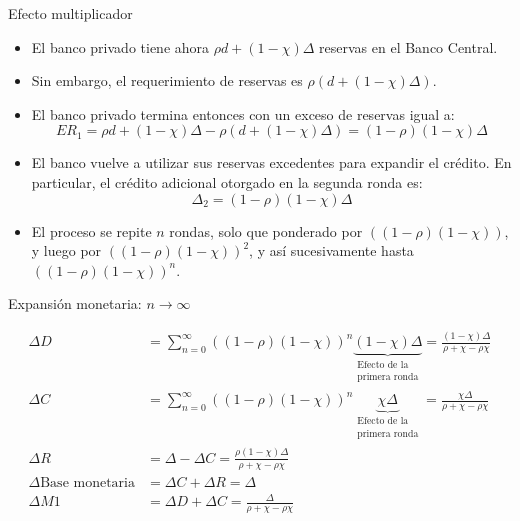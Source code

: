 \documentclass[aspectratio=169,11pt]{beamer}
\begin{document}
\begin{frame}{Efecto multiplicador}
\small
    \begin{itemize}
        \item El banco privado tiene ahora $\rho d + (1 - \chi)\Delta$ reservas en el Banco Central.
        \item Sin embargo, el requerimiento de reservas es $\rho(d + (1-\chi)\Delta)$.
        \item El banco privado termina entonces con un exceso de reservas igual a:
        $$
        ER_1 = \rho d + (1 - \chi)\Delta - \rho(d + (1-\chi)\Delta) = (1 - \rho)(1-\chi)\Delta
        $$
        \item El banco vuelve a utilizar sus reservas excedentes para expandir el crédito. En particular, el crédito adicional otorgado en la segunda ronda es:
        $$
        \Delta_2 = (1 - \rho)(1-\chi)\Delta
        $$
        \item El proceso se repite $n$ rondas, solo que ponderado por $((1 - \rho)(1-\chi))$, y luego por $((1 - \rho)(1-\chi))^2$, y así sucesivamente hasta $((1 - \rho)(1-\chi))^n$.
    \end{itemize}
\end{frame}






\begin{frame}{Expansión monetaria: $n \to \infty$}
    \footnotesize

    \begin{align*}
        \Delta D
        &= \sum_{n=0}^{\infty} ((1-\rho)(1-\chi))^n
        \underbrace{(1-\chi)\Delta}_{\substack{
        \text{Efecto de la}\\\text{primera ronda}}}
        = \frac{(1-\chi)\Delta}{\rho+\chi-\rho\chi}
        \\[0.1cm]
        \Delta C
        &= \sum_{n=0}^{\infty} ((1-\rho)(1-\chi))^n
        \underbrace{\chi\Delta}_{\substack{
        \text{Efecto de la}\\\text{primera ronda}}}
        = \frac{\chi\Delta}{\rho+\chi-\rho\chi}
        \\[0.1cm]
        \Delta R
        &= \Delta-\Delta C
        = \frac{\rho(1-\chi)\Delta}{\rho+\chi-\rho\chi}
        \\[0.1cm]
        \Delta \text{Base monetaria}
        &= \Delta C + \Delta R=\Delta
        \\[0.1cm]
        \Delta M1
        &= \Delta D+\Delta C
        = \frac{\Delta}{\rho+\chi-\rho\chi}
    \end{align*}
\end{frame}
\end{document}

